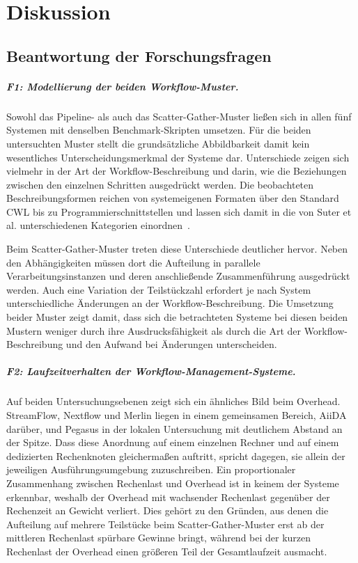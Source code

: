 
\chapter{Diskussion}
\label{sec:diskussion}

\section{Beantwortung der Forschungsfragen}
\label{sec:diskussion:fragen}

\paragraph{F1: Modellierung der beiden Workflow-Muster.}
Sowohl das Pipeline- als auch das Scatter-Gather-Muster ließen sich
in allen fünf Systemen mit denselben Benchmark-Skripten umsetzen.
Für die beiden untersuchten Muster stellt die grundsätzliche
Abbildbarkeit damit kein wesentliches Unterscheidungsmerkmal der
Systeme dar. Unterschiede zeigen sich vielmehr in der Art der
Workflow-Beschreibung und darin, wie die Beziehungen zwischen den
einzelnen Schritten ausgedrückt werden. Die
beobachteten Beschreibungsformen reichen von systemeigenen Formaten
über den Standard CWL bis zu Programmierschnittstellen und lassen
sich damit in die von Suter et al. unterschiedenen Kategorien
einordnen~\cite[S.~8]{suter2026terminology}.

Beim Scatter-Gather-Muster treten diese Unterschiede deutlicher
hervor. Neben den Abhängigkeiten müssen dort die Aufteilung in
parallele Verarbeitungsinstanzen und deren anschließende
Zusammenführung ausgedrückt werden. Auch eine Variation der
Teilstückzahl erfordert je nach System unterschiedliche Änderungen
an der Workflow-Beschreibung. Die Umsetzung beider Muster zeigt
damit, dass sich die betrachteten Systeme bei diesen beiden Mustern
weniger durch ihre Ausdrucksfähigkeit als durch die Art der
Workflow-Beschreibung und den Aufwand bei Änderungen unterscheiden.

\paragraph{F2: Laufzeitverhalten der Workflow-Management-Systeme.}
Auf beiden Untersuchungsebenen zeigt sich ein ähnliches Bild beim
Overhead. StreamFlow, Nextflow und Merlin liegen in einem
gemeinsamen Bereich, AiiDA darüber, und Pegasus in der lokalen
Untersuchung mit deutlichem Abstand an der Spitze. Dass
diese Anordnung auf einem einzelnen Rechner und auf einem
dedizierten Rechenknoten gleichermaßen auftritt, spricht dagegen,
sie allein der jeweiligen Ausführungsumgebung zuzuschreiben. Ein
proportionaler Zusammenhang zwischen Rechenlast und Overhead ist in
keinem der Systeme erkennbar, weshalb der Overhead mit wachsender
Rechenlast gegenüber der Rechenzeit an Gewicht verliert. Dies
gehört zu den Gründen, aus denen die Aufteilung auf mehrere
Teilstücke beim Scatter-Gather-Muster erst ab der mittleren
Rechenlast spürbare Gewinne bringt, während bei der kurzen
Rechenlast der Overhead einen größeren Teil der Gesamtlaufzeit ausmacht.

